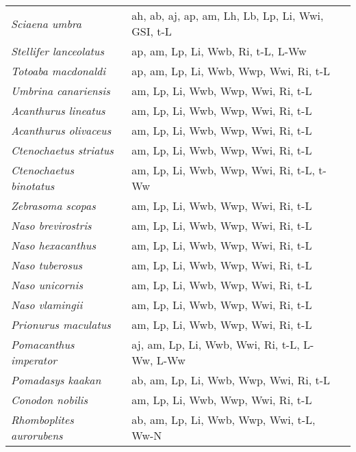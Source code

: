 {\begin{longtable}[c]{p{3.5cm}p{5.5cm}p{5.5cm}}
\emph{Sciaena umbra} &  ah, ab, aj, ap, am, Lh, Lb, Lp, Li, Wwi, GSI, t-L & \citet{LikaKooy2014,Papa2013} \\
\emph{Stellifer lanceolatus} &  ap, am, Lp, Li, Wwb, Ri, t-L, L-Ww & \citet{RamoBeja2009} \\
\emph{Totoaba macdonaldi} &  ap, am, Lp, Li, Wwb, Wwp, Wwi, Ri, t-L & \citet{CisnMont1995} \\
\emph{Umbrina canariensis} &  am, Lp, Li, Wwb, Wwp, Wwi, Ri, t-L & \citet{HutcGrif2006} \\
\emph{Acanthurus lineatus} &  am, Lp, Li, Wwb, Wwp, Wwi, Ri, t-L & \citet{ChoaAxe1996,Tuck1998} \\
\emph{Acanthurus olivaceus} &  am, Lp, Li, Wwb, Wwp, Wwi, Ri, t-L & \citet{ChoaAxe1996,Tuck1998} \\
\emph{Ctenochaetus striatus} &  am, Lp, Li, Wwb, Wwp, Wwi, Ri, t-L & \citet{ChoaAxe1996,Leis1989} \\
\emph{Ctenochaetus binotatus} &  am, Lp, Li, Wwb, Wwp, Wwi, Ri, t-L, t-Ww & \citet{Lou1993} \\
\emph{Zebrasoma scopas} &  am, Lp, Li, Wwb, Wwp, Wwi, Ri, t-L & \citet{Leis1989,ChoaAxe1996} \\
\emph{Naso brevirostris} &  am, Lp, Li, Wwb, Wwp, Wwi, Ri, t-L & \citet{ChoaAxe1996,Leis1989} \\
\emph{Naso hexacanthus} &  am, Lp, Li, Wwb, Wwp, Wwi, Ri, t-L & \citet{ChoaAxe1996,Leis1989} \\
\emph{Naso tuberosus} &  am, Lp, Li, Wwb, Wwp, Wwi, Ri, t-L & \citet{ChoaAxe1996,Leis1989} \\
\emph{Naso unicornis} &  am, Lp, Li, Wwb, Wwp, Wwi, Ri, t-L & \citet{ChoaAxe1996,Leis1989} \\
\emph{Naso vlamingii} &  am, Lp, Li, Wwb, Wwp, Wwi, Ri, t-L & \citet{ChoaAxe1996,Leis1989} \\
\emph{Prionurus maculatus} &  am, Lp, Li, Wwb, Wwp, Wwi, Ri, t-L & \citet{ChoaAxe1996,Leis1989} \\
\emph{Pomacanthus imperator} &  aj, am, Lp, Li, Wwb, Wwi, Ri, t-L, L-Ww, L-Ww & \citet{ThreBrot1985,ArelCeba2007,ChunWoo1999} \\
\emph{Pomadasys kaakan} &  ab, am, Lp, Li, Wwb, Wwp, Wwi, Ri, t-L & \citet{AlHuAlBa2002} \\
\emph{Conodon nobilis} &  am, Lp, Li, Wwb, Wwp, Wwi, Ri, t-L & \citet{PombDena2014} \\
\emph{Rhomboplites aurorubens} &  ab, am, Lp, Li, Wwb, Wwp, Wwi, t-L, Ww-N & \citet{Allm2007,CuelSedb1996} \\

\end{longtable}}
